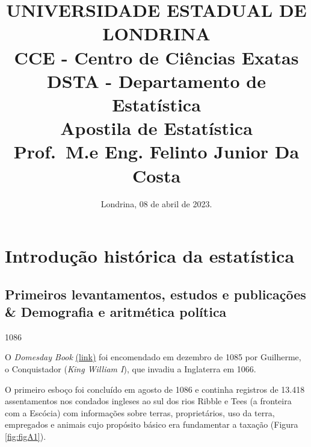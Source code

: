 \documentclass[
]{book}
\title{UNIVERSIDADE ESTADUAL DE LONDRINA\\
CCE - Centro de Ciências Exatas\\
DSTA - Departamento de Estatística\\
Apostila de Estatística\\
Prof.~M.e Eng. Felinto Junior Da Costa}
\author{}
\date{\vspace{-2.5em}Londrina, 08 de abril de 2023.}
\begin{document}
\maketitle

{
\setcounter{tocdepth}{1}
\tableofcontents
}
\hypertarget{section}{%
\chapter*{}\label{section}}

\hypertarget{introduuxe7uxe3o-histuxf3rica-da-estatuxedstica}{%
\chapter{Introdução histórica da estatística}\label{introduuxe7uxe3o-histuxf3rica-da-estatuxedstica}}

\hypertarget{primeiros-levantamentos-estudos-e-publicauxe7uxf5es-demografia-e-aritmuxe9tica-poluxedtica}{%
\section{Primeiros levantamentos, estudos e publicações \& Demografia e aritmética política}\label{primeiros-levantamentos-estudos-e-publicauxe7uxf5es-demografia-e-aritmuxe9tica-poluxedtica}}

1086

\hfill\break

O \emph{Domesday Book} \href{http://www.nationalarchives.gov.uk/education/resources/domesday-book/}{(link)}
foi encomendado em dezembro de 1085 por Guilherme, o Conquistador (\emph{King William I}), que invadiu a Inglaterra em 1066.

O primeiro esboço foi concluído em agosto de 1086 e continha registros de 13.418 assentamentos nos condados ingleses ao sul dos rios Ribble e Tees (a fronteira com a Escócia) com informações sobre terras, proprietários, uso da terra, empregados e animais cujo propósito básico era fundamentar a taxação (Figura \ref{fig:figA1}).

\hfill\break
\end{document}
